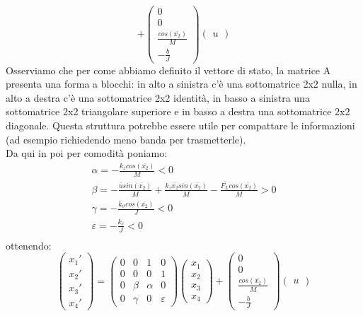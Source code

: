 \begin{displaymath}
+\left(\begin{array}{c}
0\\
0\\
\frac{cos(\bar{x_{2}})}{M}\\
-\frac{b}{J}
\end{array}\right)\left(\begin{array}{c}
u\end{array}\right)
\end{displaymath}
Osserviamo che per come abbiamo definito il vettore di stato, la matrice A presenta una forma a blocchi: in alto a sinistra c'è una sottomatrice 2x2 nulla, in alto a destra c'è una sottomatrice 2x2 identità, in basso a sinistra una sottomatrice 2x2 triangolare superiore e in basso a destra una sottomatrice 2x2 diagonale. Questa struttura potrebbe essere utile per compattare le informazioni (ad esempio richiedendo meno banda per trasmetterle). \\
Da qui in poi per comodità poniamo:
\begin{displaymath}
\begin{array}{l}
\alpha=-\frac{k_{z}cos(\bar{x_{2}})}{M}<0 \\
\beta=-\frac{\bar usin(\bar{x_{2}})} {M}+\frac{k_{z}\bar{x_{2}}sin(\bar{x_{2}})}{M}-\frac{\bar{F_L}cos(\bar{x_{2}})}{M}>0 \\
\gamma=-\frac{k_{\vartheta}cos(\bar{x_{2}})}{J}<0 \\
\varepsilon=-\frac{k_{r}}{J}<0 \\
\end{array}
\end{displaymath}
ottenendo: 
\begin{displaymath}
\left(\begin{array}{c}
x_{1}'\\
x_{2}'\\
x_{3}'\\
x_{4}'
\end{array}\right)=\left(\begin{array}{cccc}
0 & 0 & 1 & 0\\
0 & 0 & 0 & 1\\
0 & \beta & \alpha & 0\\
0 & \gamma & 0 & \varepsilon
\end{array}\right)\left(\begin{array}{c}
x_{1}\\
x_{2}\\
x_{3}\\
x_{4}
\end{array}\right)+\left(\begin{array}{c}
0\\
0\\
\frac{cos(\bar{x_{2}})}{M}\\
-\frac{b}{J}
\end{array}\right)\left(\begin{array}{c}
u\end{array}\right)
\end{displaymath}
